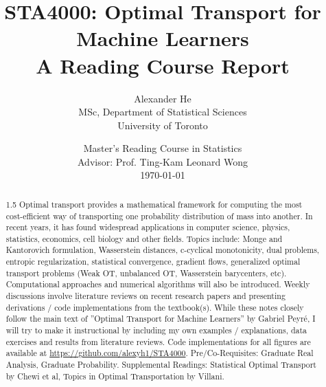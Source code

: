 \documentclass[12pt]{article}
\title{
    \vspace{2cm}
    \textbf{STA4000: Optimal Transport for Machine Learners}\\[0.5cm]
    
    \large A Reading Course Report
    \vspace{1cm}
}
\author{
    Alexander He\\
    MSc, Department of Statistical Sciences\\
    University of Toronto
}
\date{
    \vspace{0.5cm}
    Master's Reading Course in Statistics\\
    Advisor: Prof. Ting-Kam Leonard Wong\\
    \vspace{0.5cm}
    \today
}
\theoremstyle{definition}
\theoremstyle{plain}
\begin{document}
\maketitle

\thispagestyle{empty}

\newpage


\begin{abstract}
\begin{spacing}{1.5}
\normalsize
\bigskip
Optimal transport provides a mathematical framework for computing the
most cost-efficient way of transporting one probability distribution of mass
into another. In recent years, it has found widespread applications in computer science, physics, statistics, economics, cell biology and other fields.
Topics include: Monge and Kantorovich formulation, Wasserstein distances,
c-cyclical monotonicity, dual problems, entropic regularization, statistical
convergence, gradient flows, generalized optimal transport problems (Weak
OT, unbalanced OT, Wasserstein barycenters, etc). Computational approaches and numerical algorithms will also be introduced. Weekly discussions involve literature reviews on recent research papers and presenting derivations / code implementations from the textbook(s). While these notes closely follow the main text of ”Optimal Transport for Machine Learners” by Gabriel Peyré, I will try to make it instructional by including my own examples / explanations, data exercises and results from literature reviews. Code implementations for all figures are available at \url{https://github.com/alexyh1/STA4000}.
\newline
\newline
Pre/Co-Requisites: Graduate Real Analysis, Graduate Probability.
\newline
Supplemental Readings: Statistical Optimal Transport by Chewi et al, Topics in Optimal Transportation by Villani.

\end{spacing}
\end{abstract}

\newpage

\tableofcontents

\newpage
\end{document}
